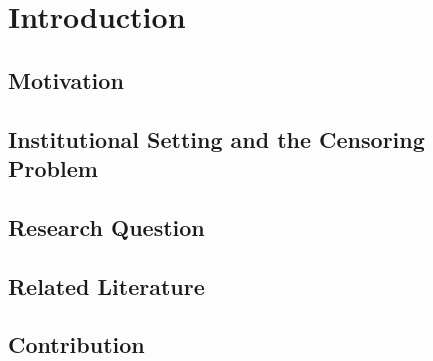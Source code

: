 \documentclass[12pt,a4paper,oneside,titlepage]{book}
\newif\ifthesisdraft
\newcommand{\draftnote}[1]{%
  \ifthesisdraft
    \par\noindent\colorbox{yellow!20}{%
      \parbox{0.94\textwidth}{\textbf{Draft note:} #1}%
    }\par
  \fi
}
\begin{document}
\tableofcontents
\listoffigures
\listoftables

\mainmatter

\chapter{Introduction}
\label{ch:introduction}

\section{Motivation}
\draftnote{Explain why high-quality wage measures matter in empirical labour economics and why legal contribution ceilings create top-coding in social-security data.}

\section{Institutional Setting and the Censoring Problem}
\draftnote{Introduce the Austrian setting and the difference between observed BG wages and uncensored Lohnzettel wages. Keep detailed data construction for \cref{ch:data}.}

\section{Research Question}
\draftnote{State one primary research question and, if useful, a small number of testable subquestions. Distinguish de-censoring from general wage forecasting.}

\section{Related Literature}
\draftnote{Position the thesis in the literature on top-coded earnings, Tobit/Card-style correction methods, machine-learning wage prediction, and interpretable machine learning.}

\section{Contribution}
\draftnote{Emphasise the use of uncensored Lohnzettel wages as the supervised-learning target and evaluation benchmark, the comparison with the classical Tobit approach, and the temporal validation exercise.}
\end{document}
